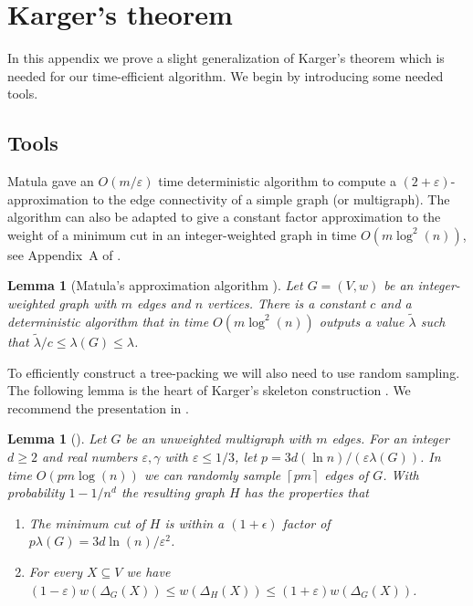 \documentclass[10pt,a4paper]{article}
\newcommand{\ceil}[1]{\left\lceil #1 \right\rceil}
\newcommand{\1}{\mathbf{1}}
\newtheorem{lemma}[theorem]{Lemma}
\theoremstyle{definition}
\begin{document}


\setcounter{theorem}{40}
\appendix
\section{Karger's theorem}
\label{app:karger}
In this appendix we prove a slight generalization of Karger's theorem \cite[Theorem 4.1]{Karger00} which is needed for our time-efficient algorithm.  
We begin by introducing some needed tools.

\subsection{Tools}
Matula \cite{Mat93} gave an $O(m/\varepsilon)$ time deterministic algorithm to compute a $(2+\varepsilon)$-approximation to the edge connectivity of a simple graph (or multigraph).  
The algorithm can also be adapted to give a constant factor approximation to the weight of a minimum cut in an integer-weighted graph in time $O(m \log^2(n))$, see Appendix~A of \cite{GMW20}.
\begin{lemma}[Matula's approximation algorithm \cite{Mat93, GMW20}]
\label{lem:matula}
Let $G = (V,w)$ be an integer-weighted graph with $m$ edges and $n$ vertices.  There is a constant $c$ and a deterministic algorithm that in time $O(m \log^2(n))$
outputs a value $\tilde \lambda$ such that $\tilde \lambda/c \le \lambda(G) \le  \lambda$.
\end{lemma}

To efficiently construct a tree-packing we will also need to use random sampling.  The following lemma is the heart of Karger's skeleton construction \cite{Karger99}.  We recommend 
the presentation in \cite[Lemma 14]{BLS20}.
\begin{lemma}[\cite{Karger99}]
\label{lem:downsample}
Let $G$ be an unweighted multigraph with $m$ edges.  For an integer $d \ge 2$ and real numbers $\varepsilon, \gamma$ with $\varepsilon \le 1/3$, 
let $p = 3d(\ln n)/(\varepsilon \lambda(G))$.  In time $O(pm \log(n))$  we can randomly sample $\ceil{pm}$ edges of $G$.  With probability $1-1/n^d$ the resulting graph $H$ has the properties that
\begin{enumerate}
  \item The minimum cut of $H$ is within a $(1+\epsilon)$ factor of $p\lambda(G) = 3d\ln(n)/\varepsilon^2$.
  \item For every $X \subseteq V$ we have $(1-\varepsilon) w(\Delta_G(X)) \le w(\Delta_H(X)) \le (1+\varepsilon) w(\Delta_G(X))$.
\end{enumerate}
\end{lemma}
\end{document}

